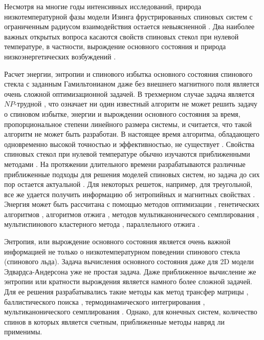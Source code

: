 \documentclass[utf8, babel, sor, jor, amsmath, amssymb, reprint]{elsarticle} %
\begin{document}
Несмотря на многие годы интенсивных исследований, природа низкотемпературной фазы модели Изинга фрустрированных спиновых систем с ограниченным радиусом взаимодействия остается невыясненной \cite{roma2010ground, newman2023proof}. Два наиболее важных открытых вопроса касаются свойств спиновых стекол при нулевой температуре, в частности, вырождение основного состояния и природа низкоэнергетических возбуждений \cite{newman2022ground}.  

Расчет энергии, энтропии и спинового избытка основного состояния спинового стекла с заданным Гамильтонианом даже без внешнего магнитного поля является очень сложной оптимизационной задачей. В трехмерном случае задача является $NP$-трудной \cite{barahona1982computational, hartmann2002optimization}, что означает ни один известный алгоритм не может решить задачу о спиновом избытке, энергии и вырождении основного состояния за время, пропорциональное степени линейного размера системы, и считается, что такой алгоритм не может быть разработан. В настоящее время алгоритма, обладающего одновременно высокой точностью и эффективностью, не существует \cite{fan2023searching}. Свойства спиновых стекол при нулевой температуре обычно изучаются приближенными методами \cite{roma2009ground, perez2012ground}. На протяжении длительного времени разрабатываются различные приближенные подходы для решения моделей спиновых систем, но задача до сих пор остается актуальной \cite{ rybin2022hybrid, makarova2023canonical,farias2024differentiable}.  Для некоторых решеток, например, для треугольной, все же удается получить информацию об энтропийных и магнитных свойствах \cite{jurvcivsinova2024classical}. Энергия может быть рассчитана с помощью методов оптимизации \cite{hartmann2002optimization, hartmann2004new}, генетических алгоритмов \cite{holland1992adaptation}, алгоритмов отжига \cite{kirkpatrick1983optimization}, методов мультиканонического семплирования \cite{berg1994ground, shevchenko2017multicanonical}, мультиспинового кластерного метода \cite{makarova2023canonical}, параллельного отжига \cite{PhysRevB.50.16444, roma2009ground}. 

Энтропия, или вырождение основного состояния является очень важной информацией не только о низкотемпературном поведении спинового стекла (спинового льда). Задача вычисления основного состояния даже для 2D модели Эдвардса-Андерсона уже не простая задача. Даже приближенное вычисление же энтропии или кратности вырождения является намного более сложной задачей. Для ее решения разрабатывались такие методы как метод трансфер матрицы \cite{PhysRevB.22.288, cheung1983equilibrium, kolan1982ground}, баллистического поиска \cite{hartmann2000ground}, термодинамического интегрирования \cite{kirkpatrick1977frustration, binder1985monte, roma2004ground}, мультиканонического семплирования \cite{berg1994ground, shevchenko2017multicanonical}. Однако, для конечных систем, количество спинов в которых является счетным, приближенные методы навряд ли применимы. 
\end{document}
